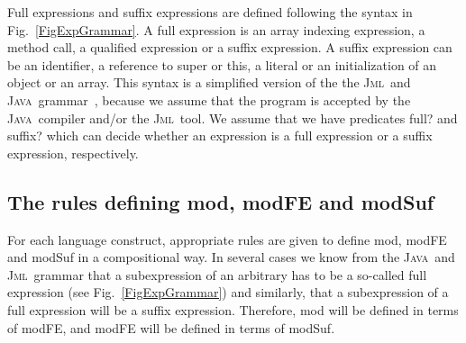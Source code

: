 \documentclass[a4paper]{llncs}
\newcommand{\jml}{\textsc{Jml}}
\newcommand{\java}{\textsc{Java}}
\begin{document}
Full expressions and suffix expressions are defined following the
syntax in Fig.~\ref{FigExpGrammar}. A full expression is an array
indexing expression, a method call, a qualified expression or a suffix
expression. A suffix expression can be an identifier, a reference to
super or this, a literal or an initialization of an object or an
array.  This syntax is a simplified version of the the \jml\ and
\java\ grammar~\cite{LeavensBR00,GoslingJSB00}, because we assume that
the program is accepted by the \java\ compiler and/or the
\jml\ tool.%
We assume that we have predicates \textsf{full?} and
\textsf{suffix?} which can decide whether an expression is a full
expression or a suffix expression, respectively.



%




\subsection{The rules defining \textsf{mod}, \textsf{modFE} and \textsf{modSuf}}
For each language construct, appropriate rules are given to define
\textsf{mod}, \textsf{modFE} and \textsf{modSuf} in a compositional
way.  In several cases we know from the
\java\ and \jml\ grammar that a subexpression of an arbitrary has to
be a so-called full expression (see Fig.~\ref{FigExpGrammar}) and
similarly, that a subexpression of a full expression will be a suffix
expression. Therefore, \textsf{mod} will be defined in terms of
\textsf{modFE}, and \textsf{modFE} will be defined in terms of \textsf{modSuf}.
\end{document}
